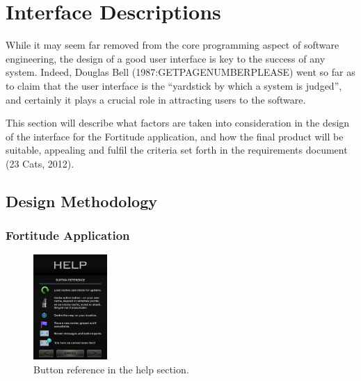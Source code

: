 \section{Interface Descriptions}

While it may seem far removed from the core programming aspect of software engineering, the design of a good user interface is key to the success of any system. Indeed, Douglas Bell (1987:GETPAGENUMBERPLEASE) went so far as to claim that the user interface is the ``yardstick by which a system is judged'', and certainly it plays a crucial role in attracting users to the software.

This section will describe what factors are taken into consideration in the design of the interface for the Fortitude application, and how the final product will be suitable, appealing and fulfil the criteria set forth in the requirements document (23 Cats, 2012).
\vspace{-10pt}
\subsection{Design Methodology}
\subsubsection{Fortitude Application}

\begin{figure}
	\vspace{-20pt}
	\begin{center}
	\includegraphics[width=0.25\textwidth]{images/help_mockup}
	\caption{Button reference in the help section.}
	\label{help_mockup}
	\end{center}
	\vspace{40pt}
\end{figure}

